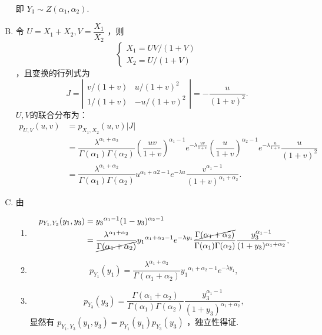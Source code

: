 \begin{example}
\begin{enumerate}[A.]
        即 $Y_3 \sim Z(\alpha_1,\alpha_2) .$
        \item 令 $U=X_1+X_2,V=\dfrac{X_1}{X_2}$ ，则 
        \[
            \left\{ \begin{array}{ll} X_{1}={UV}/{(1+V)} \\ X_{2}={U}/{(1+V)} \end{array}\right.
        \]
        ，且变换的行列式为 
        \[
            J= \left | \begin{array}{ccc} v/(1+v) & u/{(1+v)^2} \\ 1/(1+v) & -u/{(1+v)^2} \end{array} \right |=-\dfrac{u}{(1+v)^2}. 
        \]
        $U,V $的联合分布为：
        \[
            \begin{aligned} p_{U,V}(u,v)&=p_{X_1,X_2}(u,v)|J| \\ &=\dfrac{\lambda^{\alpha_1+\alpha_2}}{\Gamma(\alpha_1)\Gamma(\alpha_2)}\left(\dfrac{uv}{1+v} \right)^{\alpha_1-1}e^{-\lambda \frac{uv}{1+v} } \left(\dfrac{u}{1+v} \right)^{\alpha_2-1}e^{-\lambda \frac{u}{1+v}}\dfrac{u}{(1+v)^2}\\ &=\dfrac{\lambda^{\alpha_1+\alpha_2}}{\Gamma(\alpha_1)\Gamma(\alpha_2)}u^{\alpha_1+\alpha2-1}e^{-\lambda u } \dfrac{v^{\alpha_1-1}}{(1+v)^{\alpha_1+\alpha_2}}. \end{aligned}
        \]
        \item 由
        \begin{enumerate}[a]
            \item
            \[
                \begin{aligned} p_{Y_1,Y_3}(y_1,y_3)&={y_3}^{\alpha_1-1}(1-y_3)^{\alpha_2-1} \\ &=\dfrac{\lambda^{\alpha_1+\alpha_2}}{\cancel{\Gamma(\alpha_1+\alpha_2)}}{y_1}^{\alpha_1+\alpha_2-1}e^{-\lambda y_1} \dfrac{\cancel{\Gamma(\alpha_1+\alpha_2)}}{\Gamma(\alpha_1)\Gamma(\alpha_2)}\dfrac{y_3^{\alpha_1-1}}{(1+y_3)^{\alpha_1+\alpha_2}}, \end{aligned} 
            \]
            \item 
            \[
                p_{Y_1}(y_1)=\dfrac{\lambda^{\alpha_1+\alpha_2}}{\Gamma(\alpha_1+\alpha_2)}{y_1}^{\alpha_1+\alpha_2-1}e^{-\lambda y_1},
            \]
            \item 
            \[
                p_{Y_3}(y_3)=\dfrac{\Gamma(\alpha_1+\alpha_2)}{\Gamma(\alpha_1)\Gamma(\alpha_2)}\dfrac{y_3^{\alpha_1-1}}{(1+y_3)^{\alpha_1+\alpha_2}},
            \]
            显然有 $p_{Y_1,Y_3}(y_1,y_3)=p_{Y_1}(y_1)p_{Y_3}(y_3)$ ，独立性得证.
        \end{enumerate}
    \end{enumerate}
\end{example}

